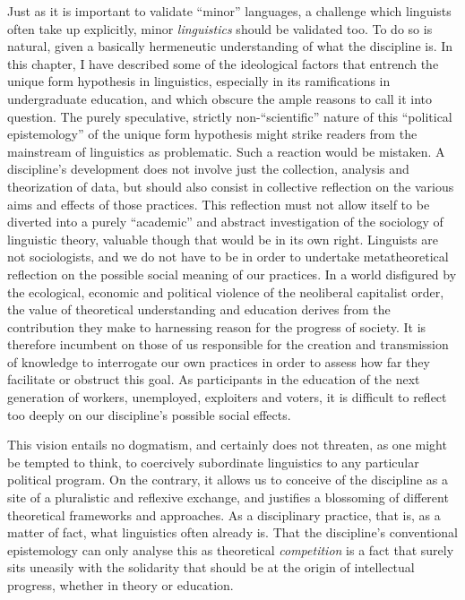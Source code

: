 \documentclass[output=paper]{langscibook}
\begin{document}
Just as it is important to validate ``minor'' languages, a challenge which linguists often take up explicitly, minor \emph{linguistics} should be validated too. To do so is natural, given a basically hermeneutic understanding of what the discipline is. In this chapter, I have described some of the ideological factors that entrench the unique form hypothesis in linguistics, especially in its ramifications in undergraduate education, and which obscure the ample reasons to call it into question. The purely speculative, strictly non-``scientific'' nature of this ``political epistemology'' of the unique form hypothesis might strike readers from the mainstream of linguistics as problematic. Such a reaction would be mistaken. A discipline's development does not involve just the collection, analysis and theorization of data, but should also consist in collective reflection on the various aims and effects of those practices. This reflection must not allow itself to be diverted into a purely ``academic'' and abstract investigation of the sociology of linguistic theory, valuable though that would be in its own right. Linguists are not sociologists, and we do not have to be in order to undertake metatheoretical reflection on the possible social meaning of our practices. In a world disfigured by the ecological, economic and political violence of the neoliberal capitalist order, the value of theoretical understanding and education derives from the contribution they make to harnessing reason for the progress of society. It is therefore incumbent on those of us responsible for the creation and transmission of knowledge to interrogate our own practices in order to assess how far they facilitate or obstruct this goal. As participants in the education of the next generation of workers, unemployed, exploiters and voters, it is difficult to reflect too deeply on our discipline's possible social effects.

This vision entails no dogmatism, and certainly does not threaten, as one might be tempted to think, to coercively subordinate linguistics to any particular political program. On the contrary, it allows us to conceive of the discipline as a site of a pluralistic and reflexive exchange, and justifies a blossoming of different theoretical frameworks and approaches. As a disciplinary practice, that is, as a matter of fact, what linguistics often already is. That the discipline's conventional epistemology can only analyse this as theoretical \emph{competition} is a fact that surely sits uneasily with the solidarity that should be at the origin of intellectual progress, whether in theory or education.

\sloppy
\printbibliography[heading=subbibliography,notkeyword=this] 
\end{document}
